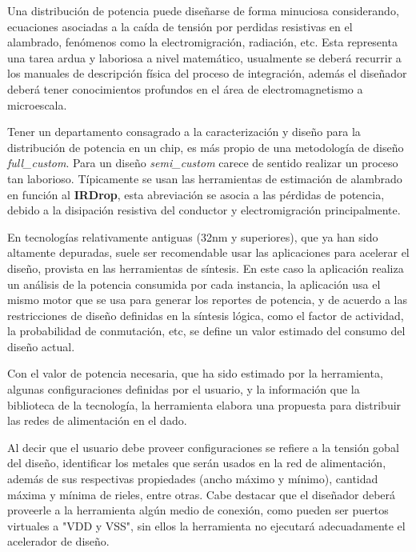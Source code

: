 Una distribución de potencia puede diseñarse de forma minuciosa considerando, ecuaciones asociadas a la caída de tensión por perdidas resistivas en el alambrado, fenómenos como la electromigración, radiación, etc. Esta representa una tarea ardua y laboriosa a nivel matemático, usualmente se deberá recurrir a los manuales de descripción física del proceso de integración, además el diseñador deberá tener conocimientos profundos en el área de electromagnetismo a microescala.

Tener un departamento consagrado a la caracterización y diseño para la distribución de potencia en un chip, es más propio de una metodología de diseño \textit{full\_custom}. Para un diseño \textit{semi\_custom} carece de sentido realizar un proceso tan laborioso. Típicamente se usan las herramientas de estimación de alambrado en función al \textbf{IRDrop}, esta abreviación se asocia a las pérdidas de potencia, debido a la disipación resistiva del conductor y electromigración principalmente.

En tecnologías relativamente antiguas (32nm y superiores), que ya han sido altamente depuradas, suele ser recomendable usar las aplicaciones para acelerar el diseño, provista en las herramientas de síntesis. En este caso la aplicación realiza un análisis de la potencia consumida por cada instancia, la aplicación usa el mismo motor que se usa para generar los reportes de potencia, y de acuerdo a las restricciones de diseño definidas en la síntesis lógica, como el factor de actividad, la probabilidad de conmutación, etc, se define un valor estimado del consumo del diseño actual.

Con el valor de potencia necesaria, que ha sido estimado por la herramienta, algunas configuraciones definidas por el usuario, y la información que la biblioteca de la tecnología, la herramienta elabora una propuesta para distribuir las redes de alimentación en el dado.

Al decir que el usuario debe proveer configuraciones se refiere a la tensión gobal del diseño, identificar los metales que serán usados en la red de alimentación, además de sus respectivas propiedades (ancho máximo y mínimo), cantidad máxima y mínima de rieles, entre otras. Cabe destacar que el diseñador deberá proveerle a la herramienta algún medio de conexión, como pueden ser puertos virtuales a "VDD y VSS", sin ellos la herramienta no ejecutará adecuadamente el acelerador de diseño.


